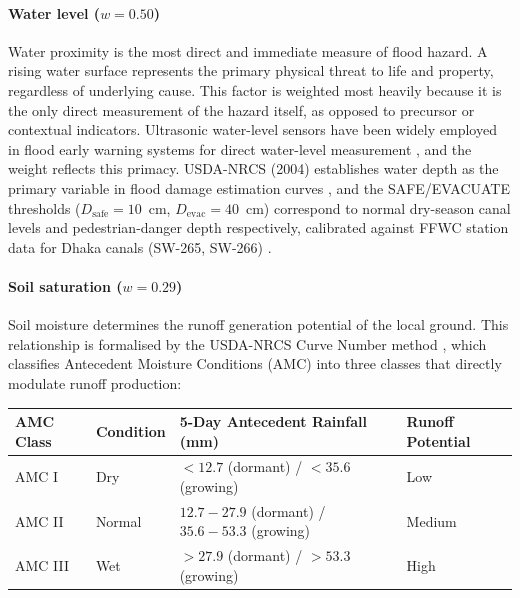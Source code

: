 \documentclass[5p,twocolumn]{elsarticle}
\begin{document}
\paragraph{Water level ($w = 0.50$)} Water proximity is the most direct and immediate measure of flood hazard. A rising water surface represents the primary physical threat to life and property, regardless of underlying cause. This factor is weighted most heavily because it is the only direct measurement of the hazard itself, as opposed to precursor or contextual indicators. Ultrasonic water-level sensors have been widely employed in flood early warning systems for direct water-level measurement \cite{ulhaq2024,sulistyowati2017,shui2022}, and the weight reflects this primacy. USDA-NRCS (2004) establishes water depth as the primary variable in flood damage estimation curves \cite{usda2004}, and the SAFE/EVACUATE thresholds ($D_{\text{safe}} = 10$~cm, $D_{\text{evac}} = 40$~cm) correspond to normal dry-season canal levels and pedestrian-danger depth respectively, calibrated against FFWC station data for Dhaka canals (SW-265, SW-266) \cite{bwdb2022,ffwc2021}.

\paragraph{Soil saturation ($w = 0.29$)} Soil moisture determines the runoff generation potential of the local ground. This relationship is formalised by the USDA-NRCS Curve Number method \cite{usda2004}, which classifies Antecedent Moisture Conditions (AMC) into three classes that directly modulate runoff production:

\medskip
\noindent
\begin{minipage}{\columnwidth}
\centering
\scriptsize
\setlength{\tabcolsep}{3pt}
\begin{tabular}{|L{2.1cm}|C{1.7cm}|C{2.5cm}|C{1.5cm}|}
  \hline
  \textbf{AMC Class} & \textbf{Condition} & \textbf{5-Day Antecedent Rainfall (mm)} & \textbf{Runoff Potential} \\ \hline
  AMC I & Dry & $< 12.7$ (dormant) / $< 35.6$ (growing) & Low \\ \hline
  AMC II & Normal & $12.7{-}27.9$ (dormant) / $35.6{-}53.3$ (growing) & Medium \\ \hline
  AMC III & Wet & $> 27.9$ (dormant) / $> 53.3$ (growing) & High \\ \hline
\end{tabular}
\label{tab:amc}
\end{minipage}
\medskip
\end{document}
